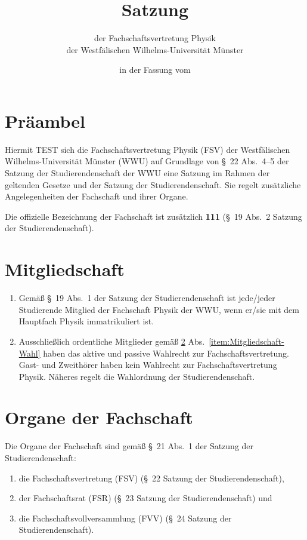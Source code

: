 \documentclass[
	a4paper,
	12pt,
	oneside,
	parskip=half-,
	pagesize,
	headsepline,
	german,
	ngerman
]{scrartcl}
\title{Satzung}
\subtitle{der Fachschaftsvertretung Physik\\
der Westfälischen Wilhelms-Universität Münster}
\date{in der Fassung vom \formatdate{17}{12}{2014}}
\author{}
\begin{document}
\maketitle

\section{Präambel}
Hiermit TEST sich die Fachschaftsvertretung Physik (FSV) der Westfälischen Wilhelms-Universi\-tät Münster (WWU) auf Grundlage von §~22 Abs.~4--5 der Satzung der Studierendenschaft der WWU eine Satzung im Rahmen der geltenden Gesetze und der Satzung der Studierendenschaft. Sie regelt zusätzliche Angelegenheiten der Fachschaft und ihrer Organe.

Die offizielle Bezeichnung der Fachschaft ist zusätzlich \textbf{111} (§~19 Abs.~2 Satzung der Studierendenschaft).

\section{Mitgliedschaft}
\label{sec:Mitgliedschaft}
\begin{enumerate}
	\item Gemäß §~19 Abs.~1 der Satzung der Studierendenschaft ist jede/jeder Studierende Mitglied der Fachschaft Physik der WWU, wenn er/sie mit dem Hauptfach Physik immatrikuliert ist. \label{item:Mitgliedschaft-Wahl}
	\item Ausschließlich ordentliche Mitglieder gemäß \ref{sec:Mitgliedschaft} Abs.~\ref{item:Mitgliedschaft-Wahl} haben das aktive und passive Wahlrecht zur Fachschaftsvertretung. Gast- und Zweithörer haben kein Wahlrecht zur Fachschaftsvertretung Physik. Näheres regelt die Wahlordnung der Studierendenschaft.
\end{enumerate}

\section{Organe der Fachschaft}
Die Organe der Fachschaft sind gemäß §~21 Abs.~1 der Satzung der Studierendenschaft:
\begin{enumerate}
	\item die Fachschaftsvertretung (FSV) (§~22 Satzung der Studierendenschaft),
	\item der Fachschaftsrat (FSR) (§~23 Satzung der Studierendenschaft) und 
	\item die Fachschaftsvollversammlung (FVV) (§~24 Satzung der Studierendenschaft).
\end{enumerate}
\end{document}
